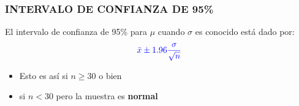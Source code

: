 \documentclass{beamer}
\begin{document}








\begin{frame}
\frametitle{INTERVALO DE CONFIANZA DE 95\%}
El intervalo de confianza de 95\% para $\mu$ cuando $\sigma$ es conocido está dado por:
$$\color{blue}{\bar{x} \pm 1.96\frac{\sigma}{\sqrt{n}}}$$
\begin{itemize}
\item Esto es así si $n\geq 30$ o bien
\item si $n<30$ pero la muestra es \textbf{normal}
\end{itemize}
\end{frame}
\end{document}
